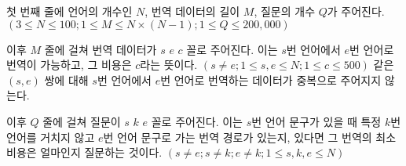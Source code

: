 첫 번째 줄에 언어의 개수인 $N$, 번역 데이터의 길이 $M$, 질문의 개수 $Q$가 주어진다. $( 3 \le N \le 100; 1 \le M \le N \times (N-1); 1 \le Q \le 200,000 )$

이후 $M$ 줄에 걸쳐 번역 데이터가 $s$ $e$ $c$ 꼴로 주어진다. 이는 $s$번 언어에서 $e$번 언어로 번역이 가능하고, 그 비용은 $c$라는 뜻이다. $( s \neq e; 1 \le s, e \le N ; 1 \le c \le 500)$ 같은 $(s , e)$ 쌍에 대해 $s$번 언어에서 $e$번 언어로 번역하는 데이터가 중복으로 주어지지 않는다.

이후 $Q$ 줄에 걸쳐 질문이 $s$ $k$ $e$ 꼴로 주어진다. 이는 $s$번 언어 문구가 있을 때 특정 $k$번 언어를 거치지 않고 $e$번 언어 문구로 가는 번역 경로가 있는지, 있다면 그 번역의 최소 비용은 얼마인지 질문하는 것이다. $(s \neq e; s \neq k ; e \neq k; 1 \le s, k, e \le N)$
